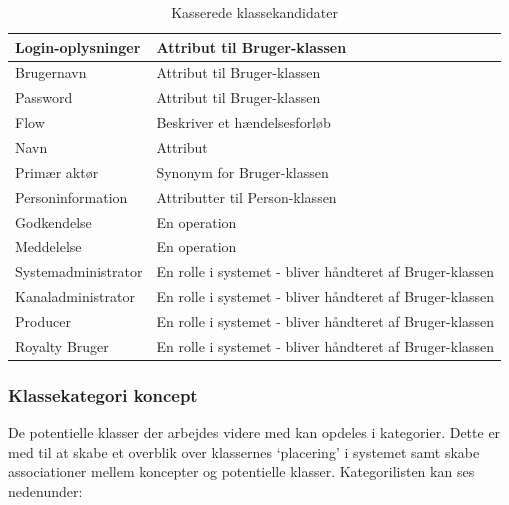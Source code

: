 \begin{table}[H]
\begin{tabularx}{\textwidth}{|X|X|}
        Login-oplysninger & Attribut til Bruger-klassen\\
        \hline
        Brugernavn & Attribut til Bruger-klassen\\
        \hline
        Password & Attribut til Bruger-klassen\\
        \hline
        Flow & Beskriver et hændelsesforløb\\
        \hline
        Navn & Attribut \\
        \hline
        Primær aktør &  Synonym for Bruger-klassen\\
        \hline
        Personinformation &  Attributter til Person-klassen\\
        \hline
        Godkendelse & En operation \\
        \hline
        Meddelelse & En operation \\
        \hline
        Systemadministrator & En rolle i systemet - bliver håndteret af Bruger-klassen \\
        \hline
        Kanaladministrator & En rolle i systemet - bliver håndteret af Bruger-klassen \\
        \hline 
        Producer & En rolle i systemet - bliver håndteret af Bruger-klassen \\
        \hline
        Royalty Bruger & En rolle i systemet - bliver håndteret af Bruger-klassen \\
        \hline
    \end{tabularx}
    \caption{Kasserede klassekandidater}
    \label{table:deleted_class_candidates}
\end{table}

\noindent
{}

\subsubsection{Klassekategori koncept}
De potentielle klasser der arbejdes videre med kan opdeles i kategorier. Dette er med til at skabe et overblik over klassernes ‘placering’ i systemet samt skabe associationer mellem koncepter og potentielle klasser.
Kategorilisten kan ses nedenunder:

